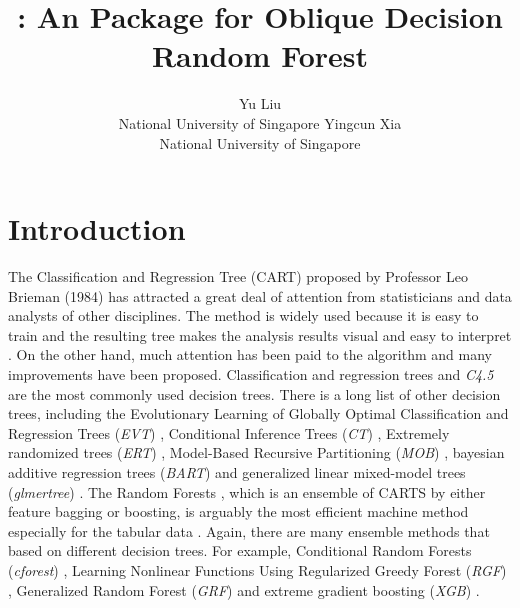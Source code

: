 \documentclass[nojss]{jss}
\author{Yu Liu\\National University of Singapore
   \And Yingcun Xia\\National University of Singapore}
\title{\pkg{ODRF}: An \proglang{R} Package for Oblique Decision Random Forest}
\numberwithin{equation}{section}
\begin{document}



\section{Introduction} \label{sec:intro}

The Classification and Regression Tree (CART) proposed by Professor Leo Brieman (1984) has attracted a great deal of attention from statisticians and data analysts of other disciplines. The method is widely used because it is easy to train and the resulting tree makes the analysis results visual and easy to interpret \citep{2014Learning}. On the other hand, much attention has been paid to the algorithm and many improvements have been proposed. Classification and regression trees  \cite[CART]{quinlan1987decision} and \emph{C4.5} \cite{quinlan1993program} are the most commonly used decision trees. There is a long list of other decision trees, including the Evolutionary Learning of Globally Optimal Classification and Regression Trees (\emph{EVT}) \cite{Grubinger2014ectree},  Conditional Inference Trees (\emph{CT}) \cite{hothorn2006unbiased}, Extremely randomized trees (\emph{ERT}) \cite{2006Extremely}, Model-Based Recursive Partitioning (\emph{MOB}) \cite{zeileis2015parties}, bayesian additive regression trees (\emph{BART}) \cite{maia2022gp} and generalized linear mixed-model trees (\emph{glmertree}) \cite{2020Generalized}.  The Random Forests \citep[RF]{breiman2001random}, which is an ensemble of CARTS by either feature bagging or boosting,   is arguably the most efficient machine method especially for the tabular data \cite{tabularDATA}. Again, there are many ensemble methods that based on different decision trees. For example, Conditional Random Forests (\emph{cforest}) \cite{hothorn2006unbiased}, Learning Nonlinear Functions Using Regularized Greedy Forest (\emph{RGF}) \cite{2014Learning}, Generalized Random Forest (\emph{GRF}) \cite{athey2019generalized} and extreme gradient boosting (\emph{XGB}) \cite{chen2016xgboost}.
\end{document}
